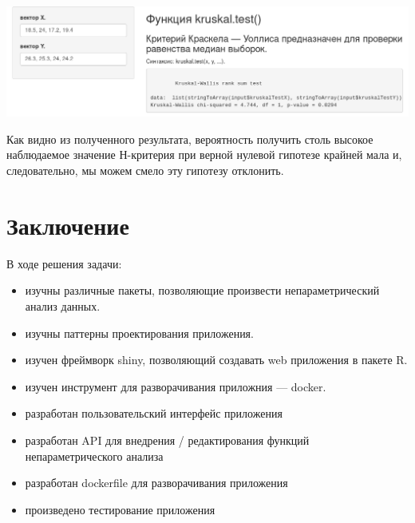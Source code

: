 \documentclass[14pt,a4paper]{scrartcl}
\begin{document}
    \includegraphics[width=\textwidth]{kruskal.png}

    Как видно из полученного результата, вероятность получить столь высокое наблюдаемое значение Н-критерия при верной нулевой гипотезе крайней мала и, следовательно, мы можем смело эту гипотезу отклонить.





    \newpage
    \section[Заключение]{Заключение}

    В ходе решения задачи:
    \begin{itemize}
        \item изучны различные пакеты, позволяющие произвести непараметрический анализ данных.
        \item изучны паттерны проектирования приложения.
        \item изучен фреймворк shiny, позволяющий создавать web приложения в пакете R.
        \item изучен инструмент для разворачивания приложния --- docker.
        \item разработан пользовательский интерфейс приложения
        \item разработан API для внедрения / редактирования функций непараметрического анализа
        \item разработан dockerfile для разворачивания приложения
        \item произведено тестирование приложения
    \end{itemize}
\end{document}

